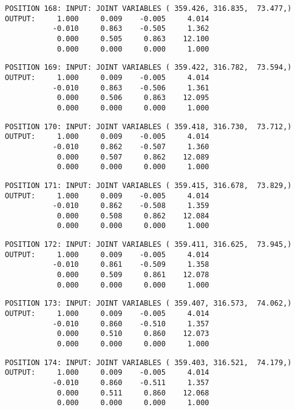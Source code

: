 \begin{verbatim}
POSITION 168: INPUT: JOINT VARIABLES ( 359.426, 316.835,  73.477,)
OUTPUT:     1.000     0.009    -0.005     4.014
           -0.010     0.863    -0.505     1.362
            0.000     0.505     0.863    12.100
            0.000     0.000     0.000     1.000
\end{verbatim} \pagebreak[1]\begin{verbatim}
POSITION 169: INPUT: JOINT VARIABLES ( 359.422, 316.782,  73.594,)
OUTPUT:     1.000     0.009    -0.005     4.014
           -0.010     0.863    -0.506     1.361
            0.000     0.506     0.863    12.095
            0.000     0.000     0.000     1.000
\end{verbatim} \pagebreak[1]\begin{verbatim}
POSITION 170: INPUT: JOINT VARIABLES ( 359.418, 316.730,  73.712,)
OUTPUT:     1.000     0.009    -0.005     4.014
           -0.010     0.862    -0.507     1.360
            0.000     0.507     0.862    12.089
            0.000     0.000     0.000     1.000
\end{verbatim} \pagebreak[1]\begin{verbatim}
POSITION 171: INPUT: JOINT VARIABLES ( 359.415, 316.678,  73.829,)
OUTPUT:     1.000     0.009    -0.005     4.014
           -0.010     0.862    -0.508     1.359
            0.000     0.508     0.862    12.084
            0.000     0.000     0.000     1.000
\end{verbatim} \pagebreak[1]\begin{verbatim}
POSITION 172: INPUT: JOINT VARIABLES ( 359.411, 316.625,  73.945,)
OUTPUT:     1.000     0.009    -0.005     4.014
           -0.010     0.861    -0.509     1.358
            0.000     0.509     0.861    12.078
            0.000     0.000     0.000     1.000
\end{verbatim} \pagebreak[1]\begin{verbatim}
POSITION 173: INPUT: JOINT VARIABLES ( 359.407, 316.573,  74.062,)
OUTPUT:     1.000     0.009    -0.005     4.014
           -0.010     0.860    -0.510     1.357
            0.000     0.510     0.860    12.073
            0.000     0.000     0.000     1.000
\end{verbatim} \pagebreak[1]\begin{verbatim}
POSITION 174: INPUT: JOINT VARIABLES ( 359.403, 316.521,  74.179,)
OUTPUT:     1.000     0.009    -0.005     4.014
           -0.010     0.860    -0.511     1.357
            0.000     0.511     0.860    12.068
            0.000     0.000     0.000     1.000
\end{verbatim} \pagebreak[1]\begin{verbatim}

\end{verbatim}
